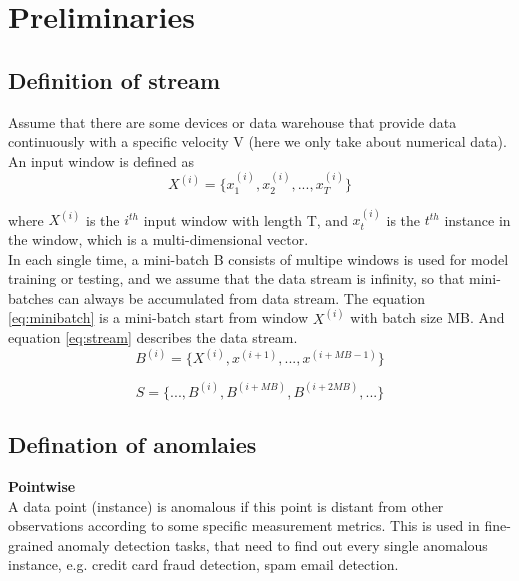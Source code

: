 \chapter{Preliminaries}
\label{Preliminaries}

\section{Definition of stream}
\label{sec:Definition of stream}

Assume that there are some devices or data warehouse that provide data continuously with a specific velocity V (here we only take about numerical data). An input window is defined as
\begin{equation} \label{eq:timeseries}
X^{(i)}=\{x_1^{(i)},x_2^{(i)}, ... , x_T^{(i)}\}
\end{equation}
	                        
	
where \textbf{$X^{(i)}$} is the \textbf{$i^{th}$} input window with length T, and \textbf{$x_t^{(i)}$} is the \textbf{$t^{th}$} instance in the window, which is a multi-dimensional vector.\\

In each single time, a mini-batch B consists of multipe windows is used for model training or testing, and we assume that the data stream is infinity, so that mini-batches can always be accumulated from data stream. The equation \ref{eq:minibatch} is a mini-batch start from window \textbf{$X^{(i)}$} with batch size MB. And equation \ref{eq:stream} describes the data stream.
\begin{equation} \label{eq:minibatch}
B^{(i)}=\{X^{(i)},x^{(i+1)}, ... , x^{(i+MB-1)}\}
\end{equation}

\begin{equation} \label{eq:stream}
S=\{..., B^{(i)},B^{(i+MB)}, B^{(i+2MB)},...\}
\end{equation}



\section{Defination of anomlaies}
\label{sec:Defination of anomalies}

\textbf{Pointwise}\\
A data point (instance) is anomalous if this point is distant from other observations according to some specific measurement metrics. This is used in fine-grained anomaly detection tasks, that need to find out every single anomalous instance, e.g. credit card fraud detection, spam email detection.\\

